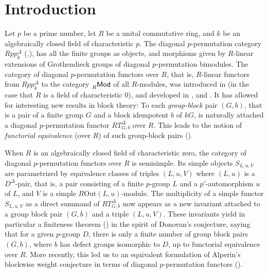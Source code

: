 \documentclass[11pt]{article}
\theoremstyle{change}  %
\newcommand{\catfont}{\mathsf}
\newcommand{\lMod}[1]{\llap{\phantom{|}}_{#1}\catfont{Mod}}
\newcommand{\Out}{\mathrm{Out}}
\begin{document}
\section{Introduction}
Let $p$ be a prime number, let $R$ be a unital commutative ring, and $k$ be an algebraically closed field of characteristic $p$. The diagonal $p$-permutation category $Rpp_k^\Delta$ (\cite{BoucYilmaz2020},\cite{BoucYilmaz2022}), has all the finite groups as objects, and morphisms given by $R$-linear extensions of Grothendieck groups of diagonal $p$-permutation bimodules. The category of diagonal $p$-permutation functors over $R$, that is, $R$-linear functors from $Rpp_k^\Delta$ to the category $\lMod{R}$ of all $R$-modules, was introduced in \cite{BoucYilmaz2020} (in the case that $R$ is a field of characteristic 0), and developed in \cite{BoucYilmaz2022}, \cite{BoucYilmaz2024} and \cite{BoucYilmaz2026}. It has allowed for interesting new results in block theory: To each {\em group-block} pair $(G,b)$, that is a pair of a finite group $G$ and a block idempotent $b$ of $kG$, is naturally attached a diagonal $p$-permutation functor $R T^\Delta_{G,b}$ over $R$. This leads to the notion of {\em functorial equivalence} (over $R$) of such group-block pairs (\cite{BoucYilmaz2022}). \par
When $R$ is an algebraically closed field of characteristic zero, the category of diagonal $p$-permutation functors over $R$ is semisimple. Its simple objects $S_{L,u,V}$ are parametrized by equivalence classes of triples $(L,u,V)$ where $(L,u)$ is a $D^\Delta$-pair, that is, a pair consisting of a finite $p$-group $L$ and a $p'$-automorphism $u$ of $L$, and $V$ is a simple $R\Out(L,u)$-module. The multiplicity of a simple functor $S_{L,u,V}$ as a direct summand of $R T^\Delta_{G,b}$ now appears as a new invariant attached to a group block pair $(G,b)$ and a triple $(L,u,V)$. These invariants yield in particular a finiteness theorem (\cite{BoucYilmaz2022}) in the spirit of Donovan's conjecture, saying that for a given $p$-group $D$, there is only a finite number of group block pairs $(G,b)$, where $b$ has defect groups isomorphic to $D$, up to functorial equivalence over $R$. More recently, this led us to an equivalent formulation of Alperin's blockwise weight conjecture in terms of diagonal $p$-permutation functors (\cite{BoltjeBoucYilmaz2026}).\par
\end{document}
